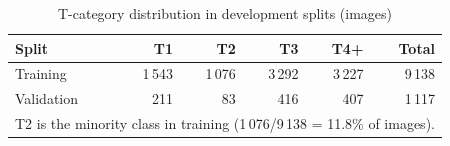 \begin{table}[htbp]
\centering
\caption{T-category distribution in development splits (images)}
\label{tab:tstage_dist}
\begin{tabular}{lrrrrr}
\toprule
Split & T1 & T2 & T3 & T4+ & Total \\
\midrule
Training & 1\,543 & 1\,076 & 3\,292 & 3\,227 & 9\,138 \\
Validation & 211 & 83 & 416 & 407 & 1\,117 \\
\midrule
\multicolumn{6}{l}{\footnotesize T2 is the minority class in training (1\,076/9\,138 = 11.8\% of images).} \\
\bottomrule
\end{tabular}
\end{table}
